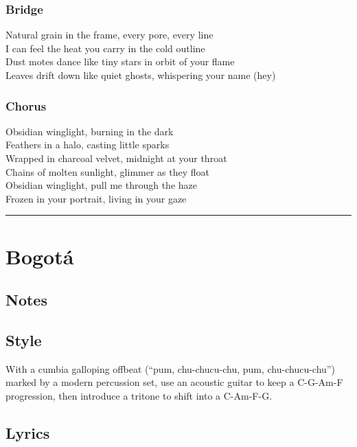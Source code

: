 \subsubsection{Bridge}\label{bridge-5}

Natural grain in the frame, every pore, every line\\
I can feel the heat you carry in the cold outline\\
Dust motes dance like tiny stars in orbit of your flame\\
Leaves drift down like quiet ghosts, whispering your name (hey)

\subsubsection{Chorus}\label{chorus-14}

Obsidian winglight, burning in the dark\\
Feathers in a halo, casting little sparks\\
Wrapped in charcoal velvet, midnight at your throat\\
Chains of molten sunlight, glimmer as they float\\
Obsidian winglight, pull me through the haze\\
Frozen in your portrait, living in your gaze

\begin{center}\rule{0.5\linewidth}{0.5pt}\end{center}

\section{Bogotá}\label{bogotuxe1}

\subsection{Notes}\label{notes-14}

\subsection{Style}\label{style-13}

With a cumbia galloping offbeat (``pum, chu-chucu-chu, pum,
chu-chucu-chu'') marked by a modern percussion set, use an acoustic
guitar to keep a C-G-Am-F progression, then introduce a tritone to shift
into a C-Am-F-G.

\subsection{Lyrics}\label{lyrics-13}

